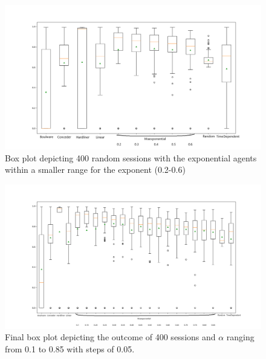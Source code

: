             
            \begin{figure}[H]
                \centering
                \includegraphics[width=15cm]{figures/Basic_test_2.png}
                \caption{Box plot depicting 400 random sessions with the exponential agents within a smaller range for the exponent (0.2-0.6)}
                \label{fig:test_2}
            \end{figure}
            
            
            \begin{figure}[H]
                \centering
                \includegraphics[width=15cm]{figures/Basic_test_3.png}
                \caption{Final box plot depicting the outcome of 400 sessions and $\alpha$ ranging from 0.1 to 0.85 with steps of 0.05.}
                \label{fig:test_3}
            \end{figure}
            
